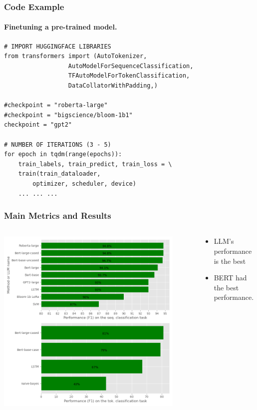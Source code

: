 \documentclass[10pt, handout]{beamer}
\begin{document}
\begin{frame}[containsverbatim]
    \frametitle{Code Example}
    \framesubtitle{Finetuning a pre-trained model.}
    \begin{verbatim}
# IMPORT HUGGINGFACE LIBRARIES
from transformers import (AutoTokenizer,
                  AutoModelForSequenceClassification,
                  TFAutoModelForTokenClassification,
                  DataCollatorWithPadding,)

#checkpoint = "roberta-large"
#checkpoint = "bigscience/bloom-1b1"
checkpoint = "gpt2"

# NUMBER OF ITERATIONS (3 - 5)
for epoch in tqdm(range(epochs)):
    train_labels, train_predict, train_loss = \
    train(train_dataloader,
        optimizer, scheduler, device)
    ... ... ...
    \end{verbatim}
\end{frame}

\begin{frame}
    \frametitle{Main Metrics and Results}
    \begin{columns}
        \begin{column}{0.7\textwidth}
            \begin{center}
                \includegraphics[width=0.9\textwidth]{../Images/taskbars.png}
            \end{center}
        \end{column}
        \begin{column}{0.3\textwidth}
            \begin{itemize}
                \item LLM's performance is the best
                    \pause
                \item BERT had the best performance.
            \end{itemize}
        \end{column}
    \end{columns}
\end{frame}
\end{document}
